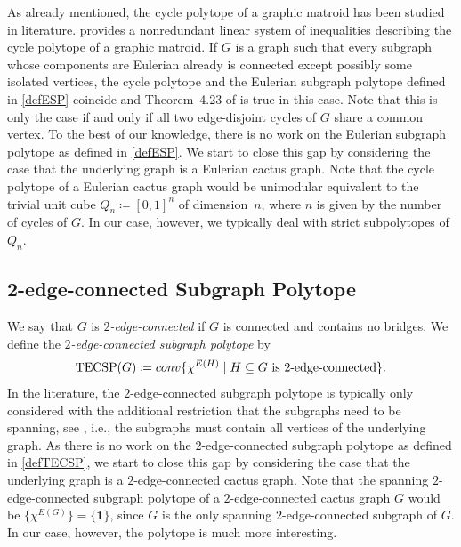 \documentclass[12pt]{amsart}
\newcommand{\conv}{\mathop{\rm conv}\nolimits}
\begin{document}
As already mentioned, the cycle polytope of a graphic matroid has been studied in literature. \cite{cyclepolytope} provides a nonredundant linear system of inequalities describing the cycle polytope of a graphic matroid. If $G$ is a graph such that every subgraph whose components are Eulerian already is connected except possibly some isolated vertices, the cycle polytope and the Eulerian subgraph polytope defined in \eqref{defESP} coincide and Theorem~4.23 of \cite{cyclepolytope} is true in this case. Note that this is only the case if and only if all two edge-disjoint cycles of $G$ share a common vertex. To the best of our knowledge, there is no work on the Eulerian subgraph polytope as defined in \eqref{defESP}. We start to close this gap by considering the case that the underlying graph is a Eulerian cactus graph. Note that the cycle polytope of a Eulerian cactus graph would be unimodular equivalent to the trivial unit cube $Q_n\coloneqq [0,1]^n$ of dimension~$n$, where $n$ is given by the number of cycles of $G$. In our case, however, we typically deal with strict subpolytopes of $Q_n$.

\subsection{2-edge-connected Subgraph Polytope}

We say that $G$ is \textit{$2$-edge-connected} if $G$ is connected and contains no bridges. We define the \textit{$2$-edge-connected subgraph polytope} by
\begin{align}
    \label{defTECSP}
    \mathrm{TECSP}(G) \coloneqq \conv\{ \chi^{E(H)} \mid H \subseteq G \text{ is } 2\text{-edge-connected} \}.
\end{align}
In the literature, the $2$-edge-connected subgraph polytope is typically only considered with the additional restriction that the subgraphs need to be spanning, see \cite{2connected}, i.e., the subgraphs must contain all vertices of the underlying graph. As there is no work on the $2$-edge-connected subgraph polytope as defined in \eqref{defTECSP}, we start to close this gap by considering the case that the underlying graph is a $2$-edge-connected cactus graph. Note that the spanning $2$-edge-connected subgraph polytope of a $2$-edge-connected cactus graph $G$ would be $\{\chi^{E(G)}\}=\{\mathbf{1}\}$, since $G$ is the only spanning $2$-edge-connected subgraph of $G$. In our case, however, the polytope is much more interesting.
\end{document}
